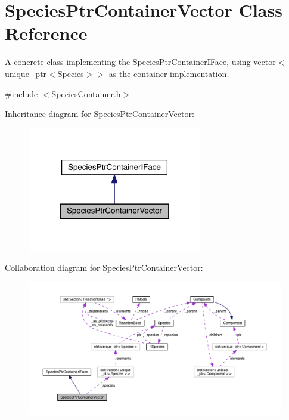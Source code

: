 \hypertarget{classSpeciesPtrContainerVector}{\section{Species\+Ptr\+Container\+Vector Class Reference}
\label{classSpeciesPtrContainerVector}
}


A concrete class implementing the \hyperlink{classSpeciesPtrContainerIFace}{Species\+Ptr\+Container\+I\+Face}, using vector$<$unique\+\_\+ptr$<$\+Species$>$$>$ as the container implementation.  




{\ttfamily \#include $<$Species\+Container.\+h$>$}



Inheritance diagram for Species\+Ptr\+Container\+Vector\+:\nopagebreak
\begin{figure}[H]
\begin{center}
\leavevmode
\includegraphics[width=216pt]{classSpeciesPtrContainerVector__inherit__graph}
\end{center}
\end{figure}


Collaboration diagram for Species\+Ptr\+Container\+Vector\+:\nopagebreak
\begin{figure}[H]
\begin{center}
\leavevmode
\includegraphics[width=350pt]{classSpeciesPtrContainerVector__coll__graph}
\end{center}
\end{figure}
